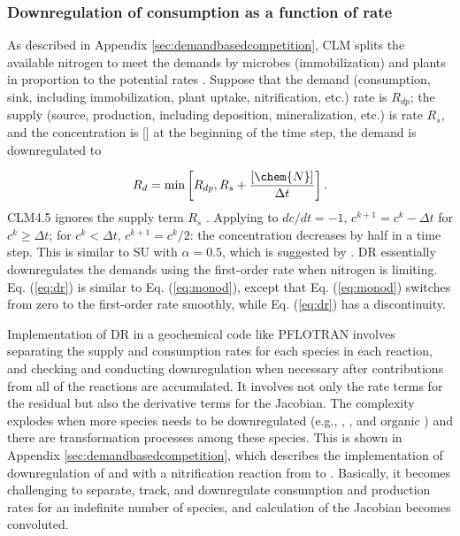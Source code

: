 \documentclass[gmd, manuscript]{copernicus}
\begin{document}
\subsubsection{Downregulation of consumption as a function of rate}
As described in Appendix \ref{sec:demandbasedcompetition}, CLM splits the
available nitrogen to meet the demands by microbes (immobilization) and plants in
proportion to the potential rates \citep{Thornton2005}. Suppose that the
demand (consumption, sink, including immobilization, plant uptake,
nitrification, etc.) rate is $R_{dp}$; the supply (source, production,
including deposition, mineralization, etc.) is rate $R_s$, and the
concentration is [] at the beginning of the time step, the demand is
downregulated to

\begin{equation}
R_d=\text{min}\left[R_{dp}, R_s + \frac{[\chem{N}]}{\Delta t}\right].	
\label{eq:dr}
\end{equation}
CLM4.5 ignores the supply term $R_s$  \citep{Oleson2013}.  
Applying to $dc/dt=-1$, $c^{k+1}=c^k-\Delta t$ for $c^k \geq \Delta t$; for
$c^k < \Delta t$, $c^{k+1} = c^k/2$: the concentration decreases by half in a
time step. This is similar to SU with $\alpha=0.5$, which is suggested by
\citet{Bethke2007}. DR essentially downregulates the demands using the
first-order rate when nitrogen is limiting. Eq. (\ref{eq:dr}) is similar
to Eq. (\ref{eq:monod}), except that Eq. (\ref{eq:monod}) switches from zero to
the first-order rate smoothly, while Eq. (\ref{eq:dr}) has a discontinuity. 

Implementation of DR in a geochemical code like PFLOTRAN involves separating
the supply and consumption rates for each species in each reaction, and
checking and conducting downregulation when necessary after contributions from
all of the reactions are accumulated. It involves not only the rate terms for
the residual but also the derivative terms for the Jacobian. The complexity
explodes when more species needs to be downregulated (e.g., ,
, and organic ) and there are transformation processes
among these species. This is shown in Appendix \ref{sec:demandbasedcompetition}, which describes the
implementation of downregulation of  and  with a
nitrification reaction from  to . Basically, it
becomes challenging to separate, track, and downregulate consumption and
production rates for an indefinite number of species, and calculation of the
Jacobian becomes convoluted.
\end{document}
